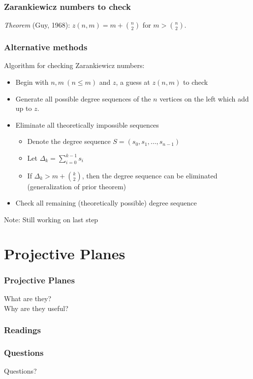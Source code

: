 \documentclass[pdf,hyperref={urlbordercolor={0 1 1}},xcolor=pdftex,dvipsnames]{beamer}
\begin{document}
\begin{frame}[noframenumbering]
  \frametitle{Zarankiewicz numbers to check}
  \begin{minipage}[b]{.52\textwidth}
    \begin{center}
      
    \end{center}
  \end{minipage}
  \begin{minipage}[b]{.44\textwidth}
    \begin{center}
      
    \end{center}
  \end{minipage}
  \textit{Theorem} (Guy, 1968): $z(n,m)=m+\binom{n}{2}$ for $m>\binom{n}{2}$.
\end{frame}

\begin{frame}
  \frametitle{Alternative methods}
  Algorithm for checking Zarankiewicz numbers:
  \begin{itemize}
    \item Begin with $n,m~(n\le m)$ and $z$, a guess at $z(n,m)$ to check
    \item Generate all possible degree sequences of the $n$ vertices on the
      left which add up to $z$.
    \item Eliminate all theoretically impossible sequences
    \begin{itemize}
      \item Denote the degree sequence $S=(s_0,s_1,\ldots,s_{n-1})$
      \item Let $\Delta_k=\sum_{i=0}^{k-1}s_i$
      \item If $\Delta_k>m+\binom{k}{2}$, then the degree sequence can be 
        eliminated (generalization of prior theorem)
    \end{itemize}
    \item Check all remaining (theoretically possible) degree sequence
  \end{itemize}
  Note: Still working on last step
\end{frame}

\section{Projective Planes}

\begin{frame}
  \frametitle{Projective Planes}
  What are they?\\Why are they useful?
\end{frame}

\begin{frame}
  \frametitle{Readings}
\end{frame}

\begin{frame}
  \frametitle{Questions}
  \begin{center}
    {\Large Questions?}
  \end{center}
\end{frame}
\end{document}
